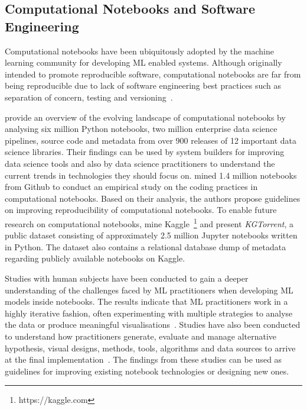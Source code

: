 \documentclass[conference]{IEEEtran}
\begin{document}
\subsection{Computational Notebooks and Software
  Engineering}\label{sec:notebooks}

Computational notebooks have been ubiquitously adopted by the machine learning community for developing ML enabled systems. Although originally intended to promote reproducible software, computational notebooks are far from being reproducible due to lack of software engineering best practices such as separation of concern, testing and versioning~\cite{pimentel2019large,wang2020better,chattopadhyay2020wrong}.

\cite{psallidas2019data} provide an overview of the evolving landscape of computational notebooks by analysing six million Python notebooks, two million enterprise data science pipelines, source code and metadata from over 900 releases of 12 important data science libraries. Their findings can be used by system builders for improving data science tools and also by data science practitioners to understand the current trends in technologies they should focus on. \cite{pimentel2019large} mined 1.4 million notebooks from Github to conduct an empirical study on the coding practices in computational notebooks. Based on their analysis, the authors propose guidelines on improving reproducibility of computational notebooks. To enable future research on computational notebooks, \cite{quaranta2021kgtorrent} mine Kaggle~\footnote{https://kaggle.com} and present \textit{KGTorrent}, a public dataset consisting of approximately 2.5 million Jupyter notebooks written in Python. The dataset also contains a relational database dump of metadata regarding publicly available notebooks on Kaggle.

Studies with human subjects have been conducted to gain a deeper understanding of the challenges faced by ML practitioners when developing ML models inside notebooks. The results indicate that ML practitioners work in a highly iterative fashion, often experimenting with multiple strategies to analyse the data or produce meaningful visualisations~\cite{kandel2012enterprise, kery2018story, liu2019understanding, chattopadhyay2020wrong}. Studies have also been conducted to understand how practitioners generate, evaluate and manage alternative hypothesis, visual designs, methods, tools, algorithms and data sources to arrive at the final implementation~\cite{liu2019understanding,kandel2012enterprise}. The findings from these studies can be used as guidelines for improving existing notebook technologies or designing new ones.
\end{document}
